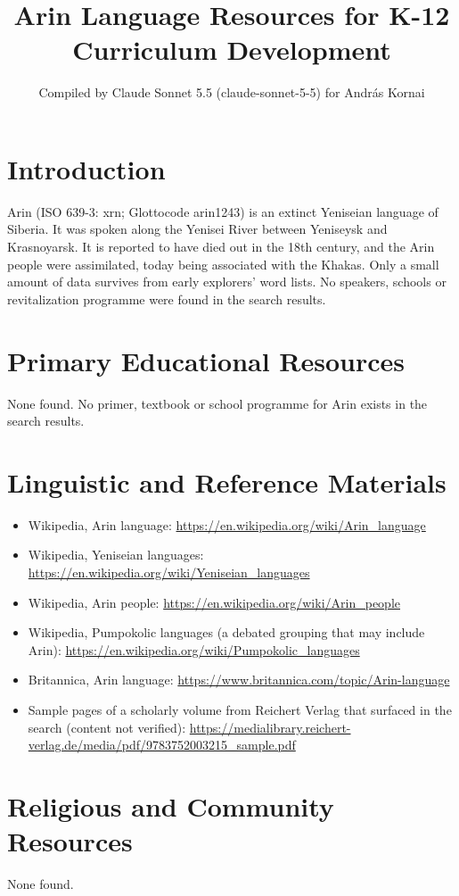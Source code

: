 \documentclass[12pt]{article}
\title{Arin Language Resources for K-12 Curriculum Development}
\author{Compiled by Claude Sonnet 5.5 (claude-sonnet-5-5) for Andr\'as Kornai}
\date{}
\begin{document}
\maketitle

\section{Introduction}
Arin (ISO 639-3: xrn; Glottocode arin1243) is an extinct Yeniseian language of Siberia. It was spoken along the Yenisei River between Yeniseysk and Krasnoyarsk. It is reported to have died out in the 18th century, and the Arin people were assimilated, today being associated with the Khakas. Only a small amount of data survives from early explorers' word lists. No speakers, schools or revitalization programme were found in the search results.

\section{Primary Educational Resources}
None found. No primer, textbook or school programme for Arin exists in the search results.

\section{Linguistic and Reference Materials}
\begin{itemize}
\item Wikipedia, Arin language: \url{https://en.wikipedia.org/wiki/Arin_language}
\item Wikipedia, Yeniseian languages: \url{https://en.wikipedia.org/wiki/Yeniseian_languages}
\item Wikipedia, Arin people: \url{https://en.wikipedia.org/wiki/Arin_people}
\item Wikipedia, Pumpokolic languages (a debated grouping that may include Arin): \url{https://en.wikipedia.org/wiki/Pumpokolic_languages}
\item Britannica, Arin language: \url{https://www.britannica.com/topic/Arin-language}
\item Sample pages of a scholarly volume from Reichert Verlag that surfaced in the search (content not verified): \url{https://medialibrary.reichert-verlag.de/media/pdf/9783752003215_sample.pdf}
\end{itemize}

\section{Religious and Community Resources}
None found.
\end{document}
